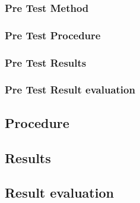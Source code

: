 \subsubsection{Pre Test Method}
\subsubsection{Pre Test Procedure}
\subsubsection{Pre Test Results}
\subsubsection{Pre Test Result evaluation}

\subsection{Procedure}
\subsection{Results}
\subsection{Result evaluation}
